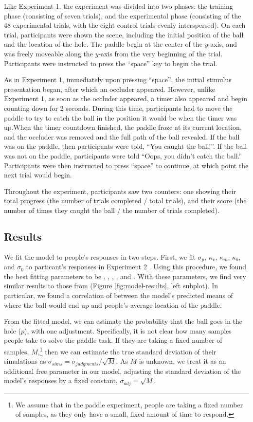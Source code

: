 \documentclass[10pt,letterpaper]{article}
\begin{document}
Like Experiment 1, the experiment was divided into two phases: the training phase (consisting of seven trials), and the experimental phase (consisting of the 48 experimental trials, with the eight control trials evenly interspersed). On each trial, participants were shown the scene, including the initial position of the ball and the location of the hole. The paddle begin at the center of the $y$-axis, and was freely moveable along the $y$-axis from the very beginning of the trial. Participants were instructed to press the ``space'' key to begin the trial. 

As in Experiment 1, immediately upon pressing ``space'', the initial stimulus presentation began, after which an occluder appeared. However, unlike Experiment 1, as soon as the occluder appeared, a timer also appeared and begin counting down for 2 seconds. During this time, participants had to move the paddle to try to catch the ball in the position it would be when the timer was up.When the timer countdown finished, the paddle froze at its current location, and the occluder was removed and the full path of the ball revealed. If the ball was on the paddle, then participants were told, ``You caught the ball!''. If the ball was not on the paddle, participants were told ``Oops, you didn't catch the ball.'' Participants were then instructed to press ``space'' to continue, at which point the next trial would begin.

Throughout the experiment, participants saw two counters: one showing their total progress (the number of trials completed / total trials), and their score (the number of times they caught the ball / the number of trials completed).

\subsection{Results}
We fit the model to people's responses in two steps. First, we fit $\sigma_p$, $\kappa_v$, $\kappa_m$, $\kappa_b$, and $\sigma_0$ to particant's responses in Experiment 2 \cite<for details, see>{Smith:2013fc}. Using this procedure, we found the best fitting parameters to be \perr{}, \kapv{}, \kapm{}, \kapb{}, and \sdzero{}. With these parameters, we find very similar results to those from  (Figure \ref{fig:model-results}, left subplot). In particular, we found a correlation of \PaddleCorr{} between the model's predicted means of where the ball would end up and people's average location of the paddle.

From the fitted model, we can estimate the probability that the ball goes in the hole ($p$), with one adjustment. Specifically, it is not clear how many samples people take to solve the paddle task. If they are taking a fixed number of samples, $M$,\footnote{We assume that in the paddle experiment, people are taking a fixed number of samples, as they only have a small, fixed amount of time to respond.} then we can estimate the true standard deviation of their simulations as $\sigma_{sims} = \sigma_{judgments} / \sqrt{M}$. As $M$ is unknown, we treat it as an additional free parameter in our model, adjusting the standard deviation of the model's responses by a fixed constant, $\sigma_{adj}=\sqrt{M}$.



\setlength{\bibleftmargin}{.125in}
\setlength{\bibindent}{-\bibleftmargin}


\end{document}

